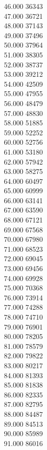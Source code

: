 { 46.000	36343 \\
 47.000	36721 \\
 48.000	37143 \\
 49.000	37496 \\
 50.000	37964 \\
 51.000	38305 \\
 52.000	38737 \\
 53.000	39212 \\
 54.000	42509 \\
 55.000	47955 \\
 56.000	48479 \\
 57.000	48830 \\
 58.000	51885 \\
 59.000	52252 \\
 60.000	52756 \\
 61.000	53180 \\
 62.000	57942 \\
 63.000	58275 \\
 64.000	60497 \\
 65.000	60999 \\
 66.000	63141 \\
 67.000	63590 \\
 68.000	67121 \\
 69.000	67568 \\
 70.000	67980 \\
 71.000	68523 \\
 72.000	69045 \\
 73.000	69456 \\
 74.000	69928 \\
 75.000	70368 \\
 76.000	73914 \\
 77.000	74288 \\
 78.000	74710 \\
 79.000	76901 \\
 80.000	78205 \\
 81.000	78579 \\
 82.000	79822 \\
 83.000	80217 \\
 84.000	81393 \\
 85.000	81838 \\
 86.000	82335 \\
 87.000	82795 \\
 88.000	84487 \\
 89.000	84513 \\
 90.000	85989 \\
 91.000	86016 \\
}

